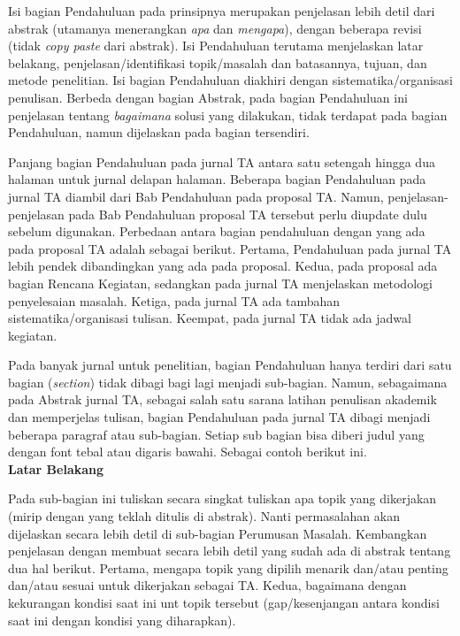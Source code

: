 Isi bagian Pendahuluan pada prinsipnya merupakan penjelasan lebih detil dari abstrak (utamanya menerangkan \textit{apa} dan \textit{mengapa}), dengan beberapa revisi (tidak \textit{copy paste} dari abstrak).  Isi Pendahuluan terutama menjelaskan latar belakang, penjelasan/identifikasi topik/masalah dan batasannya, tujuan, dan metode penelitian. Isi bagian Pendahuluan diakhiri dengan sistematika/organisasi penulisan. Berbeda dengan bagian Abstrak, pada bagian Pendahuluan ini penjelasan tentang \textit{bagaimana} solusi yang dilakukan, tidak terdapat pada bagian Pendahuluan, namun dijelaskan pada bagian tersendiri.

Panjang bagian Pendahuluan pada jurnal TA antara satu setengah hingga dua halaman untuk jurnal delapan halaman. Beberapa bagian Pendahuluan pada jurnal TA diambil dari Bab Pendahuluan pada proposal TA. Namun, penjelasan-penjelasan pada Bab Pendahuluan proposal TA tersebut perlu diupdate dulu sebelum digunakan. Perbedaan antara bagian pendahuluan dengan yang ada pada proposal TA adalah sebagai berikut. Pertama, Pendahuluan pada jurnal TA lebih pendek dibandingkan yang ada pada proposal. Kedua, pada proposal ada bagian Rencana Kegiatan, sedangkan pada jurnal TA menjelaskan metodologi penyelesaian masalah. Ketiga, pada jurnal TA ada tambahan  sistematika/organisasi tulisan. Keempat, pada jurnal TA tidak ada jadwal kegiatan.

Pada banyak jurnal untuk penelitian, bagian Pendahuluan hanya terdiri dari satu bagian (\textit{section}) tidak dibagi bagi lagi menjadi sub-bagian. Namun, sebagaimana pada Abstrak jurnal TA, sebagai salah satu sarana latihan penulisan akademik dan memperjelas tulisan, bagian Pendahuluan pada jurnal TA dibagi menjadi beberapa paragraf atau sub-bagian. Setiap sub bagian bisa diberi judul yang dengan font tebal atau digaris bawahi. Sebagai contoh berikut ini.\\

\noindent\textbf{Latar Belakang}

Pada sub-bagian ini tuliskan secara singkat tuliskan apa topik yang dikerjakan (mirip dengan yang teklah ditulis di abstrak). Nanti permasalahan akan dijelaskan secara lebih detil di sub-bagian Perumusan Masalah. Kembangkan penjelasan dengan membuat secara lebih detil yang sudah ada di abstrak tentang dua hal berikut. Pertama, mengapa topik yang dipilih menarik dan/atau penting dan/atau sesuai untuk dikerjakan sebagai TA. Kedua, bagaimana dengan kekurangan kondisi saat ini unt topik tersebut (gap/kesenjangan antara kondisi saat ini dengan kondisi yang diharapkan).

